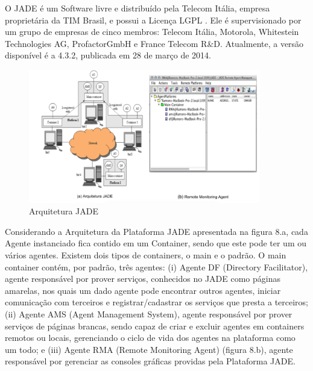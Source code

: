 O JADE é um Software livre e distribuído pela Telecom Itália, empresa proprietária da TIM Brasil, e possui a Licença LGPL \cite{telecon2014}. Ele é supervisionado por um grupo de empresas de cinco membros: Telecom Itália, Motorola, Whitestein Technologies AG, ProfactorGmbH e France Telecom R\&D. Atualmente, a versão disponível é a 4.3.2, publicada em 28 de março de 2014.

\begin{figure}[h]
\centering
\label{f10}
\includegraphics[width=0.9\textwidth]{figuras/f08}
\caption{Arquitetura JADE}

\end{figure}


Considerando a Arquitetura da Plataforma JADE apresentada na figura 8.a, cada Agente instanciado fica contido em um Container, sendo que este pode ter um ou vários agentes. Existem dois tipos de containers, o main e o padrão. O main container contém, por padrão, três agentes: (i) Agente DF (Directory Facilitator), agente responsável por prover serviços, conhecidos no JADE como páginas amarelas, nos quais um dado agente pode encontrar outros agentes, iniciar comunicação com terceiros e registrar/cadastrar os serviços que presta a terceiros; (ii) Agente AMS (Agent Management System), agente responsável por prover serviços de páginas brancas, sendo capaz de criar e excluir agentes em containers remotos ou locais, gerenciando o ciclo de vida dos agentes na plataforma como um todo; e (iii) Agente RMA (Remote Monitoring Agent) (figura 8.b), agente responsável por gerenciar as consoles gráficas providas pela Plataforma JADE.

